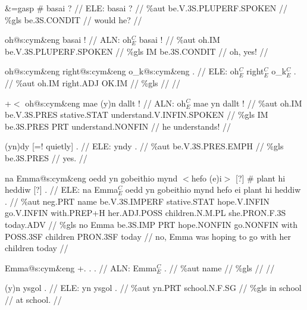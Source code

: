 \documentclass[a4paper,10pt]{article}
\begin{document}
\ex
\begingl[lingstyle=gergl]
\glchat \&=gasp \# basai ? //
\glsurface ELE:  basai ?  //
\glauto \%aut  be{\scriptsize .V.3S.PLUPERF.SPOKEN}   //
\glmanual \%gls  be{\scriptsize .3S.CONDIT}   //
\gleng would he? //
\endgl
\xe

\ex
\begingl[lingstyle=gergl]
\glchat oh@s:cym\&eng basai ! //
\glsurface ALN:  oh$^{C}_{E}$ basai !  //
\glauto \%aut  oh{\scriptsize .IM} be{\scriptsize .V.3S.PLUPERF.SPOKEN}   //
\glmanual \%gls  IM be{\scriptsize .3S.CONDIT}   //
\gleng oh, yes! //
\endgl
\xe

\ex
\begingl[lingstyle=gergl]
\glchat oh@s:cym\&eng right@s:cym\&eng o\_k@s:cym\&eng . //
\glsurface ELE:  oh$^{C}_{E}$ right$^{C}_{E}$ o\_k$^{C}_{E}$ .  //
\glauto \%aut  oh{\scriptsize .IM} right{\scriptsize .ADJ} OK{\scriptsize .IM}   //
\glmanual \%gls       //
\gleng  //
\endgl
\xe

\ex
\begingl[lingstyle=gergl]
\glchat +$<$ oh@s:cym\&eng mae (y)n dallt ! //
\glsurface ALN:  oh$^{C}_{E}$ mae yn dallt !  //
\glauto \%aut  oh{\scriptsize .IM} be{\scriptsize .V.3S.PRES} stative{\scriptsize .STAT} understand{\scriptsize .V.INFIN.SPOKEN}   //
\glmanual \%gls  IM be{\scriptsize .3S.PRES} PRT understand{\scriptsize .NONFIN}   //
\gleng he understands! //
\endgl
\xe

\ex
\begingl[lingstyle=gergl]
\glchat (yn)dy [=! quietly] . //
\glsurface ELE:  yndy .  //
\glauto \%aut  be{\scriptsize .V.3S.PRES.EMPH}   //
\glmanual \%gls  be{\scriptsize .3S.PRES}   //
\gleng yes. //
\endgl
\xe

\ex
\begingl[lingstyle=gergl]
\glchat na Emma@s:cym\&eng oedd yn gobeithio mynd $<$hefo (e)i$>$ [?] \# plant hi heddiw [?] . //
\glsurface ELE:  na Emma$^{C}_{E}$ oedd yn gobeithio mynd hefo ei plant hi heddiw .  //
\glauto \%aut  neg{\scriptsize .PRT} name be{\scriptsize .V.3S.IMPERF} stative{\scriptsize .STAT} hope{\scriptsize .V.INFIN} go{\scriptsize .V.INFIN} with{\scriptsize .PREP+H} her{\scriptsize .ADJ.POSS} children{\scriptsize .N.M.PL} she{\scriptsize .PRON.F.3S} today{\scriptsize .ADV}   //
\glmanual \%gls  no Emma be{\scriptsize .3S.IMP} PRT hope{\scriptsize .NONFIN} go{\scriptsize .NONFIN} with POSS{\scriptsize .3SF} children PRON{\scriptsize .3SF} today   //
\gleng no, Emma was hoping to go with her children today //
\endgl
\xe

\ex
\begingl[lingstyle=gergl]
\glchat Emma@s:cym\&eng +. . . //
\glsurface ALN:  Emma$^{C}_{E}$ .  //
\glauto \%aut  name   //
\glmanual \%gls     //
\gleng  //
\endgl
\xe

\ex
\begingl[lingstyle=gergl]
\glchat (y)n ysgol . //
\glsurface ELE:  yn ysgol .  //
\glauto \%aut  yn{\scriptsize .PRT} school{\scriptsize .N.F.SG}   //
\glmanual \%gls  in school   //
\gleng at school. //
\endgl
\xe
\end{document}
